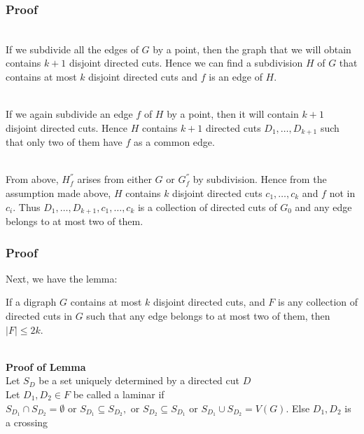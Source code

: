\documentclass[8pt]{beamer}
\begin{document}
\begin{frame}
\frametitle{Proof}
\begin{block}\\
If we subdivide all the edges of $G$ by a point, then the graph that we will obtain contains $k+1$ disjoint directed cuts. Hence we can find a subdivision $H$ of $G$ that contains at most $k$ disjoint directed cuts and $f$ is an edge of $H$.
\end{block}

\begin{block}\\
If we again subdivide an edge $f$ of $H$ by a point, then it will contain $k+1$ disjoint directed cuts. Hence $H$ contains $k+1$ directed cuts $D_1,\dots,D_{k+1}$ such that only two of them have $f$ as a common edge. 
\end{block}

\begin{block}\\
From above, $H_f^{''}$ arises from either $G$ or $G_f^{''}$ by subdivision. Hence from the assumption made above, $H$ contains $k$ disjoint directed cuts $c_1,\dots,c_k$ and $f$ not in $c_i$. Thus $D_1,\dots,D_{k+1},c_1,\dots,c_k$ is a collection of directed cuts of $G_0$ and any edge belongs to at most two of them. 
\end{block}

\end{frame}

\begin{frame}
\frametitle{Proof}

Next, we have the lemma:\\
\begin{ly_lemma}[]
If a digraph $G$ contains at most $k$ disjoint directed cuts, and $F$ is any collection of directed cuts in $G$ such that any edge belongs to at most two of them, then $|F| \le 2k$. 
\end{ly_lemma}

\begin{block}\\
\textbf{Proof of Lemma}\\
Let $S_D$ be a set uniquely determined by a directed cut $D$\\
Let $D_1, D_2 \in F$ be called a laminar if $S_{D_1}\cap S_{D_2}=\emptyset \text{ or } S_{D_1}\subseteq S_{D_2}, \text{ or } S_{D_2}\subseteq S_{D_1} \text{ or } S_{D_1}\cup S_{D_2} = V(G)$. Else $D_1, D_2$ is a crossing\\
\end{block}

\end{frame}
\end{document}
